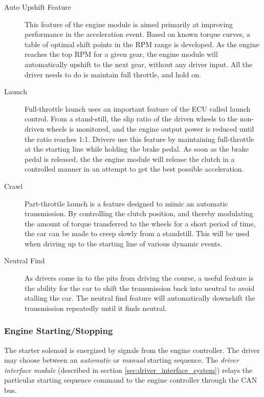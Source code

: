 \begin{description}

\item[Auto Upshift Feature]

This feature of the engine module is aimed primarily at improving performance in the acceleration event. Based on known torque curves, a table of optimal shift points in the RPM range is developed. As the engine reaches the top RPM for a given gear, the engine module will automatically upshift to the next gear, without any driver input. All the driver needs to do is maintain full throttle, and hold on.

\item[Launch]
Full-throttle launch uses an important feature of the ECU called launch control. From a stand-still, the slip ratio of the driven wheels to the non-driven wheels is monitored, and the engine output power is reduced until the ratio reaches 1:1. Drivers use this feature by maintaining full-throttle at the starting line while holding the brake pedal. As soon as the brake pedal is released, the the engine module will release the clutch in a controlled manner in an attempt to get the best possible acceleration.

\item[Crawl]
Part-throttle launch is a feature designed to mimic an automatic transmission. By controlling the clutch position, and thereby modulating the amount of torque transferred to the wheels for a short period of time, the car can be made to creep slowly from a standstill. This will be used when driving up to the starting line of various dynamic events.

\item[Neutral Find]
As drivers come in to the pits from driving the course, a useful feature is the ability for the car to shift the transmission back into neutral to avoid stalling the car. The neutral find feature will automatically downshift the transmission repeatedly until it finds neutral.

\end{description}


\subsubsection{Engine Starting/Stopping}

The starter solenoid is energized by signals from the engine controller. The driver may choose between an \emph{automatic} or \emph{manual} starting sequence. The \emph{driver interface module} (described in section \ref{sec:driver_interface_system}) relays the particular starting sequence command to the engine controller through the CAN bus.

